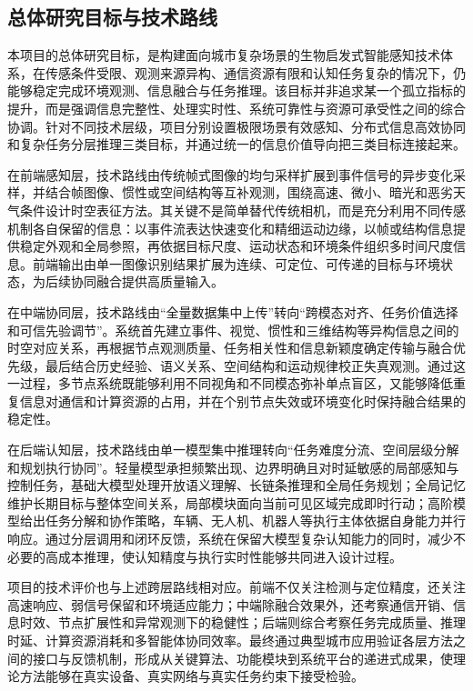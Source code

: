 \subsection{总体研究目标与技术路线}

本项目的总体研究目标，是构建面向城市复杂场景的生物启发式智能感知技术体系，在传感条件受限、观测来源异构、通信资源有限和认知任务复杂的情况下，仍能够稳定完成环境观测、信息融合与任务推理。该目标并非追求某一个孤立指标的提升，而是强调信息完整性、处理实时性、系统可靠性与资源可承受性之间的综合协调。针对不同技术层级，项目分别设置极限场景有效感知、分布式信息高效协同和复杂任务分层推理三类目标，并通过统一的信息价值导向把三类目标连接起来。

在前端感知层，技术路线由传统帧式图像的均匀采样扩展到事件信号的异步变化采样，并结合帧图像、惯性或空间结构等互补观测，围绕高速、微小、暗光和恶劣天气条件设计时空表征方法。其关键不是简单替代传统相机，而是充分利用不同传感机制各自保留的信息：以事件流表达快速变化和精细运动边缘，以帧或结构信息提供稳定外观和全局参照，再依据目标尺度、运动状态和环境条件组织多时间尺度信息。前端输出由单一图像识别结果扩展为连续、可定位、可传递的目标与环境状态，为后续协同融合提供高质量输入。

在中端协同层，技术路线由“全量数据集中上传”转向“跨模态对齐、任务价值选择和可信先验调节”。系统首先建立事件、视觉、惯性和三维结构等异构信息之间的时空对应关系，再根据节点观测质量、任务相关性和信息新颖度确定传输与融合优先级，最后结合历史经验、语义关系、空间结构和运动规律校正失真观测。通过这一过程，多节点系统既能够利用不同视角和不同模态弥补单点盲区，又能够降低重复信息对通信和计算资源的占用，并在个别节点失效或环境变化时保持融合结果的稳定性。

在后端认知层，技术路线由单一模型集中推理转向“任务难度分流、空间层级分解和规划执行协同”。轻量模型承担频繁出现、边界明确且对时延敏感的局部感知与控制任务，基础大模型处理开放语义理解、长链条推理和全局任务规划；全局记忆维护长期目标与整体空间关系，局部模块面向当前可见区域完成即时行动；高阶模型给出任务分解和协作策略，车辆、无人机、机器人等执行主体依据自身能力并行响应。通过分层调用和闭环反馈，系统在保留大模型复杂认知能力的同时，减少不必要的高成本推理，使认知精度与执行实时性能够共同进入设计过程。

项目的技术评价也与上述跨层路线相对应。前端不仅关注检测与定位精度，还关注高速响应、弱信号保留和环境适应能力；中端除融合效果外，还考察通信开销、信息时效、节点扩展性和异常观测下的稳健性；后端则综合考察任务完成质量、推理时延、计算资源消耗和多智能体协同效率。最终通过典型城市应用验证各层方法之间的接口与反馈机制，形成从关键算法、功能模块到系统平台的递进式成果，使理论方法能够在真实设备、真实网络与真实任务约束下接受检验。

